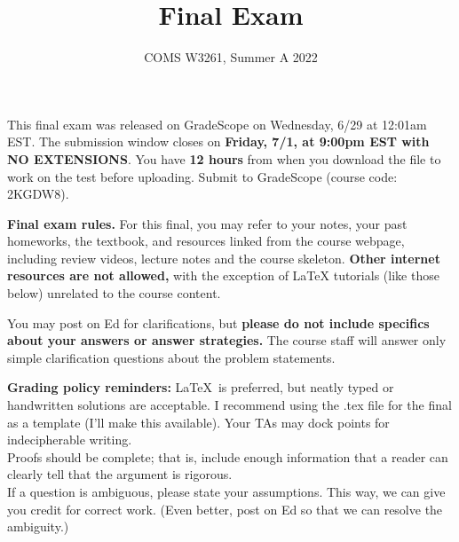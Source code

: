 \documentclass[letterpaper,11pt,twoside]{article}
\title{Final Exam}
\date{COMS W3261, Summer A 2022}
\theoremstyle{plain}
\theoremstyle{definition}
\theoremstyle{remark}
\theoremstyle{restate}
\begin{document}
\maketitle

This final exam was released on GradeScope on Wednesday, 6/29 at 12:01am EST. The submission window closes on \textbf{Friday, 7/1, at 9:00pm EST with NO EXTENSIONS}. You have \textbf{12 hours} from when you download the file to work on the test before uploading. Submit to GradeScope (course code: 2KGDW8).

\textbf{Final exam rules.} For this final, you may refer to your notes, your past homeworks, the textbook, and resources linked from the course webpage, including review videos, lecture notes and the course skeleton. \textbf{Other internet resources are not allowed,} with the exception of LaTeX tutorials (like those below) unrelated to the course content.

You may post on Ed for clarifications, but \textbf{please do not include specifics about your answers or answer strategies.} The course staff will answer only simple clarification questions about the problem statements.

\textbf{Grading policy reminders:} \LaTeX~is preferred, but neatly typed or handwritten solutions are acceptable. I recommend using the .tex file for the final as a template (I'll make this available). Your TAs may dock points for indecipherable writing.\\

Proofs should be complete; that is, include enough information that a reader can clearly tell that the argument is rigorous. \\

If a question is ambiguous, please state your assumptions. This way, we can give you credit for correct work. (Even better, post on Ed so that we can resolve the ambiguity.) \\
\end{document}

